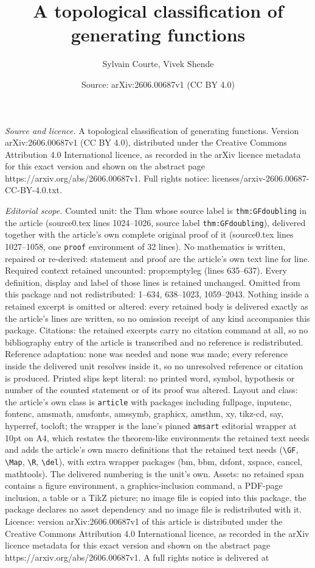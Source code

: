 \documentclass[10pt,a4paper]{amsart}
\title[A topological classification of generating functions]{A topological classification of generating functions}
\author{Sylvain Courte, Vivek Shende}
\date{Source: arXiv:2606.00687v1 (CC BY 4.0)}
\begin{document}
\maketitle

\noindent\emph{Source and licence.} A topological classification of generating functions. Version arXiv:2606.00687v1 (CC BY 4.0), distributed under the Creative Commons Attribution 4.0 International licence, as recorded in the arXiv licence metadata for this exact version and shown on the abstract page https://arxiv.org/abs/2606.00687v1. Full rights notice: licenses/arxiv-2606.00687-CC-BY-4.0.txt.\par\smallskip

\noindent\textit{Editorial scope.} Counted unit: the Thm whose source label is \texttt{thm:GFdoubling} in the article (source0.tex lines 1024--1026, source label \texttt{thm:GFdoubling}), delivered together with the article's own complete original proof of it (source0.tex lines 1027--1058, one \texttt{proof} environment of 32 lines). No mathematics is written, repaired or re-derived: statement and proof are the article's own text line for line. Required context retained uncounted: prop:emptyleg (lines 635--637). Every definition, display and label of those lines is retained unchanged. Omitted from this package and not redistributed: 1--634, 638--1023, 1059--2043. Nothing inside a retained excerpt is omitted or altered: every retained body is delivered exactly as the article's lines are written, so no omission receipt of any kind accompanies this package. Citations: the retained excerpts carry no citation command at all, so no bibliography entry of the article is transcribed and no reference is redistributed. Reference adaptation: none was needed and none was made; every reference inside the delivered unit resolves inside it, so no unresolved reference or citation is produced. Printed slips kept literal: no printed word, symbol, hypothesis or number of the counted statement or of its proof was altered. Layout and class: the article's own class is \texttt{article} with packages including fullpage, inputenc, fontenc, amsmath, amsfonts, amssymb, graphicx, amsthm, xy, tikz-cd, say, hyperref, tocloft; the wrapper is the lane's pinned \texttt{amsart} editorial wrapper at 10pt on A4, which restates the theorem-like environments the retained text needs and adds the article's own macro definitions that the retained text needs (\texttt{\textbackslash GF}, \texttt{\textbackslash Map}, \texttt{\textbackslash R}, \texttt{\textbackslash del}), with extra wrapper packages (bm, bbm, dsfont, xspace, cancel, mathtools). The delivered numbering is the unit's own. Assets: no retained span contains a figure environment, a graphics-inclusion command, a PDF-page inclusion, a table or a TikZ picture; no image file is copied into this package, the package declares no asset dependency and no image file is redistributed with it. Licence: version arXiv:2606.00687v1 of this article is distributed under the Creative Commons Attribution 4.0 International licence, as recorded in the arXiv licence metadata for this exact version and shown on the abstract page https://arxiv.org/abs/2606.00687v1. A full rights notice is delivered at 
\end{document}

